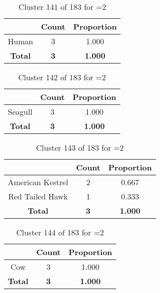 \begin{table}[ht!]
\centering
\begin{tabular}{|c|c|c|}
\hline
\bf \Spec{} &\bf Count &\bf Proportion\\ \hline \hline
Human & 3 & 1.000\\ \hline
\hline
\bf Total & \bf 3 & \bf 1.000\\ \hline
\end{tabular}
\label{tab:cluster:141:2}
\caption{Cluster 141 of 183 for \minneigh{}=2}
\end{table}

\begin{table}[ht!]
\centering
\begin{tabular}{|c|c|c|}
\hline
\bf \Spec{} &\bf Count &\bf Proportion\\ \hline \hline
Seagull & 3 & 1.000\\ \hline
\hline
\bf Total & \bf 3 & \bf 1.000\\ \hline
\end{tabular}
\label{tab:cluster:142:2}
\caption{Cluster 142 of 183 for \minneigh{}=2}
\end{table}

\begin{table}[ht!]
\centering
\begin{tabular}{|c|c|c|}
\hline
\bf \Spec{} &\bf Count &\bf Proportion\\ \hline \hline
American Kestrel & 2 & 0.667\\ \hline
Red Tailed Hawk & 1 & 0.333\\ \hline
\hline
\bf Total & \bf 3 & \bf 1.000\\ \hline
\end{tabular}
\label{tab:cluster:143:2}
\caption{Cluster 143 of 183 for \minneigh{}=2}
\end{table}

\begin{table}[ht!]
\centering
\begin{tabular}{|c|c|c|}
\hline
\bf \Spec{} &\bf Count &\bf Proportion\\ \hline \hline
Cow & 3 & 1.000\\ \hline
\hline
\bf Total & \bf 3 & \bf 1.000\\ \hline
\end{tabular}
\label{tab:cluster:144:2}
\caption{Cluster 144 of 183 for \minneigh{}=2}
\end{table}

